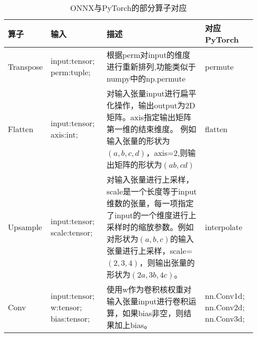 \begin{table}
	\centering
	\caption{ONNX与PyTorch的部分算子对应}
	\label{table:onnx-operators}
	\begin{tabularx}{\linewidth}{ p{2cm}  p{2.2cm}  p{5.8cm}  X  }
		\toprule
		\textbf{算子} & \textbf{输入} & \textbf{描述} & \textbf{对应PyTorch} \\
        \midrule
        Transpose & 
        input:tensor; perm:tuple; &
        根据perm对input的维度进行重新排列,功能类似于numpy中的np.permute
        & permute \\
        \midrule
        Flatten & 
        input:tensor; axis:int; &
        对输入张量input进行扁平化操作，输出output为2D矩阵。axis指定输出矩阵第一维的结束维度。
        例如输入张量的形状为$(a,b,c,d)$，axis=2,则输出矩阵的形状为$(ab, cd)$&
        flatten
        \\
        \midrule
        Upsample &
        input:tensor; scale:tensor;&
        对输入张量进行上采样，scale是一个长度等于input维数的张量，每一项指定了input的一个维度进行上采样时的缩放参数。例如对形状为$(a,b,c)$的输入张量进行上采样，scale=$(2,3,4)$，则输出张量的形状为$(2a,3b,4c)。$&
        interpolate
        \\
        \midrule
        Conv &
        input:tensor; w:tensor; bias:tensor; &
        使用w作为卷积核权重对输入张量input进行卷积运算，如果bias非空，则结果加上bias。&
        nn.Conv1d; nn.Conv2d; nn.Conv3d;
        \\
        \bottomrule
	\end{tabularx}
\end{table}
